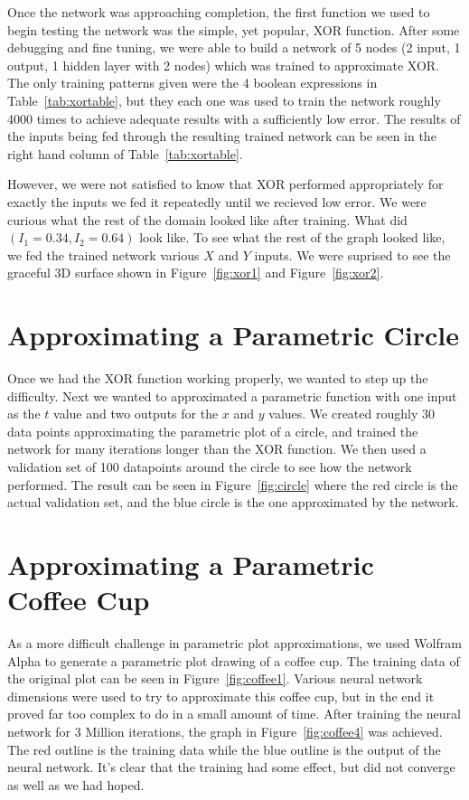 \documentclass{article}
\begin{document}
\begin{multicols}{2}
Once the network was approaching completion, the first function we used to begin testing the network was the simple, yet popular, XOR function. After some debugging and fine tuning, we were able to build a network of 5 nodes (2 input, 1 output, 1 hidden layer with 2 nodes) which was trained to approximate XOR. The only training patterns given were the 4 boolean expressions in Table~\ref{tab:xortable}, but they each one was used to train the network roughly 4000 times to achieve adequate results with a sufficiently low error. The results of the inputs being fed through the resulting trained network can be seen in the right hand column of Table~\ref{tab:xortable}.

However, we were not satisfied to know that XOR performed appropriately for exactly the inputs we fed it repeatedly until we recieved low error. We were curious what the rest of the domain looked like after training. What did $(I_1=0.34, I_2=0.64)$ look like. To see what the rest of the graph looked like, we fed the trained network various $X$ and $Y$ inputs. We were suprised to see the graceful 3D surface shown in Figure~\ref{fig:xor1} and Figure~\ref{fig:xor2}.

\section{Approximating a Parametric Circle}

Once we had the XOR function working properly, we wanted to step up the difficulty. Next we wanted to approximated a parametric function with one input as the $t$ value and two outputs for the $x$ and $y$ values. We created roughly 30 data points approximating the parametric plot of a circle, and trained the network for many iterations longer than the XOR function. We then used a validation set of 100 datapoints around the circle to see how the network performed. The result can be seen in Figure~\ref{fig:circle} where the red circle is the actual validation set, and the blue circle is the one approximated by the network.

\section{Approximating a Parametric Coffee Cup}

As a more difficult challenge in parametric plot approximations, we used Wolfram Alpha to generate a parametric plot drawing of a coffee cup. The training data of the original plot can be seen in Figure~\ref{fig:coffee1}. Various neural network dimensions were used to try to approximate this coffee cup, but in the end it proved far too complex to do in a small amount of time. After training the neural network for 3 Million iterations, the graph in Figure~\ref{fig:coffee4} was achieved. The red outline is the training data while the blue outline is the output of the neural network. It's clear that the training had some effect, but did not converge as well as we had hoped.


\end{multicols}
\end{document}
